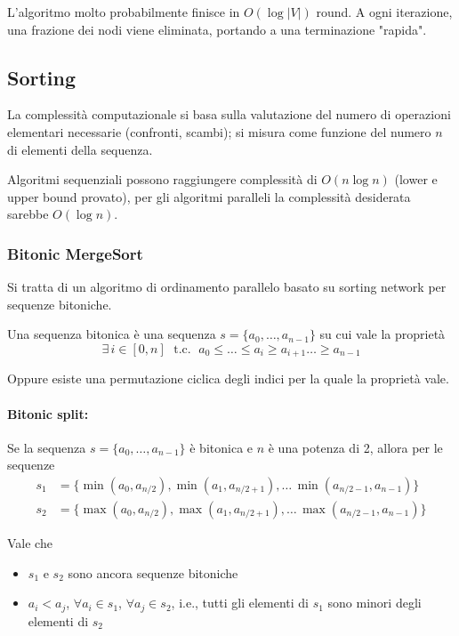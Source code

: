 L'algoritmo molto probabilmente finisce in $O(\log |V|)$ round. A ogni iterazione, una frazione dei nodi viene eliminata, portando a una terminazione "rapida".

\subsection{Sorting}

La complessità computazionale si basa sulla valutazione del numero di operazioni elementari necessarie (confronti, scambi); si misura come funzione del numero $n$ di elementi della sequenza.

Algoritmi sequenziali possono raggiungere complessità di $O (n \log n)$ (lower e upper bound provato), per gli algoritmi paralleli la complessità desiderata sarebbe $O (\log n)$.

\subsubsection{Bitonic MergeSort}

Si tratta di un algoritmo di ordinamento parallelo basato su sorting network per sequenze bitoniche.

Una sequenza bitonica è una sequenza $s = \{a_0, \dots, a_{n-1}\}$ su cui vale la proprietà
$$ \exists \, i \in [0,n] \; \text{ t.c. } \; a_0 \leq \dots \leq a_i \geq a_{i+1} \dots \geq a_{n-1} $$

Oppure esiste una permutazione ciclica degli indici per la quale la proprietà vale. 

\paragraph{Bitonic split:} Se la sequenza $s = \{a_0, \dots, a_{n-1}\}$ è bitonica e $n$ è una potenza di 2, allora per le sequenze
\begin{align*}
    s_1 & = \{ \min (a_0, a_{n/2}), \min (a_1, a_{n/2 + 1}), \dots \, \min (a_{n/2 - 1}, a_{n-1}) \} \\
    s_2 & = \{ \max (a_0, a_{n/2}), \max (a_1, a_{n/2 + 1}), \dots \, \max (a_{n/2 - 1}, a_{n-1}) \}
\end{align*}

Vale che 
\begin{itemize}
    \item $s_1$ e $s_2$ sono ancora sequenze bitoniche
    
    \item $a_i < a_j$, $\forall a_i \in s_1$, $\forall a_j \in s_2$, i.e., tutti gli elementi di $s_1$ sono minori degli elementi di $s_2$
\end{itemize}

